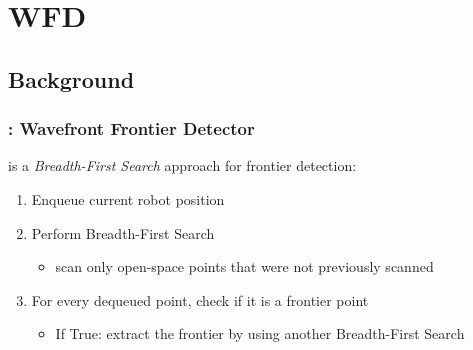 \section{WFD}
 \subsection*{Background}

\begin{frame}
\frametitle{\WFD: Wavefront Frontier Detector}
  \WFD is a \emph{Breadth-First Search} approach for frontier detection:

\begin{enumerate}
  \item Enqueue current robot position
  \item Perform Breadth-First Search 
  	\begin{itemize}
  	  \item scan only open-space points that were not previously scanned
  	\end{itemize}
  \item For every dequeued point, check if it is a frontier point
  \begin{itemize}
    \item If True: extract the frontier by using another Breadth-First Search
  \end{itemize}
\end{enumerate}
\end{frame}

